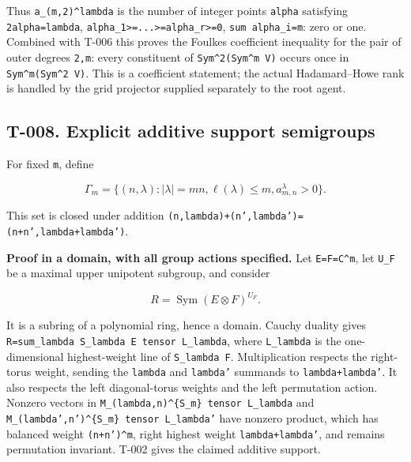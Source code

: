 \documentclass[
  10pt,
]{article}
\begin{document}
Thus
\texttt{\small a\_\allowbreak{}(\allowbreak{}m,\allowbreak{}2)\allowbreak{}\textasciicircum{}lambda}
is the number of integer points \texttt{\small alpha} satisfying
\texttt{\small 2alpha=\allowbreak{}lambda},
\texttt{\small alpha\_\allowbreak{}1>=\allowbreak{}...>=\allowbreak{}alpha\_\allowbreak{}r>=\allowbreak{}0},
\texttt{\small sum alpha\_\allowbreak{}i=\allowbreak{}m}: zero or one.
Combined with T-006 this proves the Foulkes coefficient inequality for
the pair of outer degrees \texttt{\small 2,\allowbreak{}m}: every
constituent of
\texttt{\small Sym\textasciicircum{}2(\allowbreak{}Sym\textasciicircum{}m V)\allowbreak{}}
occurs once in
\texttt{\small Sym\textasciicircum{}m(\allowbreak{}Sym\textasciicircum{}2 V)\allowbreak{}}.
This is a coefficient statement; the actual Hadamard--Howe rank is
handled by the grid projector supplied separately to the root agent.

\subsection{T-008. Explicit additive support
semigroups}\label{t-008.-explicit-additive-support-semigroups}

For fixed \texttt{\small m}, define

\[
\Gamma_m=\{(n,\lambda):|\lambda|=mn,\ell(\lambda)\le m,
a_{m,n}^\lambda>0\}.
\]

This set is closed under addition
\texttt{\small (\allowbreak{}n,\allowbreak{}lambda)\allowbreak{}+\allowbreak{}(\allowbreak{}n',\allowbreak{}lambda')\allowbreak{}=\allowbreak{}(\allowbreak{}n+\allowbreak{}n',\allowbreak{}lambda+\allowbreak{}lambda')\allowbreak{}}.

\textbf{Proof in a domain, with all group actions specified.} Let
\texttt{\small E=\allowbreak{}F=\allowbreak{}C\textasciicircum{}m}, let
\texttt{\small U\_\allowbreak{}F} be a maximal upper unipotent subgroup,
and consider

\[
R=\operatorname{Sym}(E\otimes F)^{U_F}.
\]

It is a subring of a polynomial ring, hence a domain. Cauchy duality
gives
\texttt{\small R=\allowbreak{}sum\_\allowbreak{}lambda S\_\allowbreak{}lambda E tensor L\_\allowbreak{}lambda},
where \texttt{\small L\_\allowbreak{}lambda} is the one-dimensional
highest-weight line of \texttt{\small S\_\allowbreak{}lambda F}.
Multiplication respects the right-torus weight, sending the
\texttt{\small lambda} and \texttt{\small lambda'} summands to
\texttt{\small lambda+\allowbreak{}lambda'}. It also respects the left
diagonal-torus weights and the left permutation action. Nonzero vectors
in
\texttt{\small M\_\allowbreak{}(\allowbreak{}lambda,\allowbreak{}n)\allowbreak{}\textasciicircum{}\{S\_\allowbreak{}m\} tensor L\_\allowbreak{}lambda}
and
\texttt{\small M\_\allowbreak{}(\allowbreak{}lambda',\allowbreak{}n')\allowbreak{}\textasciicircum{}\{S\_\allowbreak{}m\} tensor L\_\allowbreak{}lambda'}
have nonzero product, which has balanced weight
\texttt{\small (\allowbreak{}n+\allowbreak{}n')\allowbreak{}\textasciicircum{}m},
right highest weight \texttt{\small lambda+\allowbreak{}lambda'}, and
remains permutation invariant. T-002 gives the claimed additive support.
\end{document}
